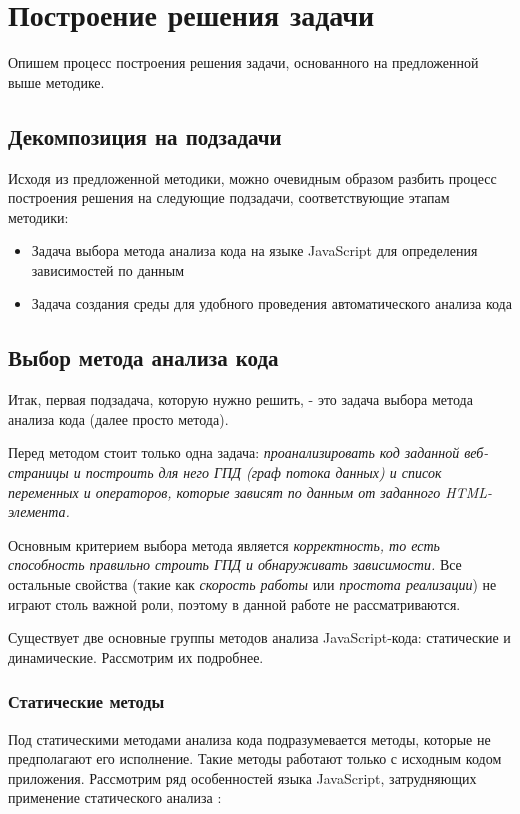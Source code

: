 
\chapter{Построение решения задачи}\label{Solution}
Опишем процесс построения решения задачи, основанного на предложенной выше методике.

\section{Декомпозиция на подзадачи}
Исходя из предложенной методики, можно очевидным образом разбить процесс построения решения на следующие подзадачи, соответствующие этапам методики:

\begin{itemize}
	\item Задача выбора метода анализа кода на языке JavaScript для определения зависимостей по данным
	\item Задача создания среды для удобного проведения автоматического анализа кода
\end{itemize}

\section{Выбор метода анализа кода}

Итак, первая подзадача, которую нужно решить, - это задача выбора метода анализа кода (далее просто метода). 

\bigskip
Перед методом стоит только одна задача: \textit{проанализировать код заданной веб-страницы и построить для него ГПД (граф потока данных) и список переменных и операторов, которые зависят по данным от заданного HTML-элемента.}

\bigskip
Основным критерием выбора метода является \textit{корректность, то есть способность правильно строить ГПД и обнаруживать зависимости.} Все остальные свойства (такие как \textit{скорость работы} или \textit{простота реализации}) не играют столь важной роли, поэтому в данной работе не рассматриваются.

\bigskip
Существует две основные группы методов анализа JavaScript-кода: статические и динамические. Рассмотрим их подробнее.

\subsection{Статические методы}
	Под статическими методами анализа кода подразумевается методы, которые не предполагают его исполнение. Такие методы работают только с исходным кодом приложения. Рассмотрим ряд особенностей языка JavaScript, затрудняющих применение статического анализа \cite{hardekopf}:

